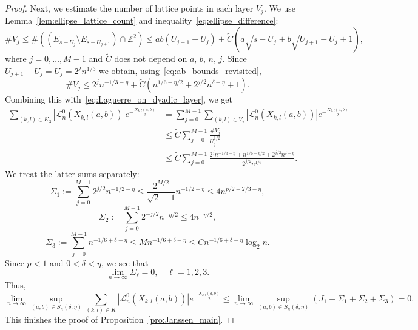 \documentclass[11pt]{amsart}
\numberwithin{equation}{section}
\newcommand{\Z}{{\mathbb Z}}
\begin{document}
\begin{proof}
    Next, we estimate the number of lattice points in each layer $V_j$. We use Lemma~\ref{lem:ellipse_lattice_count} and inequality~\eqref{eq:ellipse_difference}:
    \begin{equation}
        \#V_j \leq \#((E_{s-U_j}\setminus E_{s-U_{j+1}})\cap \Z^2) \leq ab (U_{j+1}-U_{j}) + \widetilde{C} \left(a \sqrt{s-U_j} + b \sqrt{U_{j+1}-U_{j}} +1\right),
    \end{equation}
    where $j=0,\dots,M-1$ and $\widetilde{C}$ does not depend on $a, \, b, \, n, \, j$. Since $U_{j+1}-U_j = U_j = 2^j n^{1/3}$ we obtain, using~\eqref{eq:ab_bounds_revisited},
    \begin{equation}
        \#V_j \leq 2^j n^{-1/3-\eta} + \widetilde{C} (n^{1/6-\eta/2} + 2^{j/2} n^{\delta-\eta} +1).
    \end{equation}
    Combining this with~\eqref{eq:Laguerre_on_dyadic_layer}, we get
    \begin{align}
        \sum\limits_{(k,l)\in K_3} |\mathcal{L}_n^{0}(X_{k,l}(a,b))|e^{-\frac{X_{k,l}(a,b)}{2}}
        & = \sum\limits_{j=0}^{M-1} \sum\limits_{(k,l)\in V_j}
        |\mathcal{L}_n^{0}(X_{k,l}(a,b))|e^{-\frac{X_{k,l}(a,b)}{2}}\\
        & \leq \widetilde{C} \sum\limits_{j=0}^{M-1} \frac{\#V_j}{U_j^{1/2}}\\
        & \leq \widetilde{C} \sum\limits_{j=0}^{M-1}  \frac{2^j n^{-1/3-\eta} + n^{1/6-\eta/2} + 2^{j/2} n^{\delta-\eta}}{2^{j/2}n^{1/6}}. 
    \end{align}
    We treat the latter sums separately:
    \begin{equation}
        \Sigma_1 := \sum\limits_{j=0}^{M-1} 2^{j/2}n^{-1/2-\eta}
        \leq \frac{2^{M/2}}{\sqrt{2}-1} n^{-1/2-\eta}
        \leq 4n^{p/2-2/3-\eta},
    \end{equation}
    \begin{equation}
        \Sigma_2 := \sum\limits_{j=0}^{M-1} 2^{-j/2}n^{-\eta/2}
        \leq 4n^{-\eta/2},
    \end{equation}
    \begin{equation}
        \Sigma_3 := \sum\limits_{j=0}^{M-1} n^{-1/6+\delta-\eta}
        \leq M n^{-1/6+\delta-\eta}
         \leq C n^{-1/6+\delta-\eta} \log_2 n.
    \end{equation}
    Since $p<1$ and  $0 < \delta < \eta$, we see that
    \begin{equation}
        \lim_{n \to \infty} \Sigma_\ell = 0, \quad \ell = 1,2,3.
    \end{equation}
Thus, 
\begin{equation}
     \lim\limits_{n \to \infty} \sup\limits_{(a,b) \in S_n(\delta, \eta)} \sum\limits_{(k,l)\in K} |\mathcal{L}_n^{0}(X_{k,l}(a,b))|e^{-\frac{X_{k,l}(a,b)}{2}} \leq \lim_{n \to \infty} \sup\limits_{(a,b) \in S_n(\delta, \eta)} (J_1 + \Sigma_1 +\Sigma_2+ \Sigma_3) = 0.
\end{equation}
This finishes the proof of Proposition~\ref{pro:Janssen_main}.
\end{proof}
\end{document}
